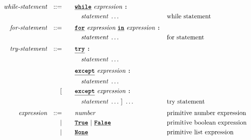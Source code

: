 \begin{alignat*}{9}
&& \textit{while-statement} && ::= &\quad &&  \textbf{\texttt{\underline{while}}}\ \textit{expression} \ 
                                           \textbf{\texttt{:}}  \\
&&                       &&     &\quad && \quad \textit{statement} \ \ldots \quad
                                                           &&  \textrm{while statement} \\[1mm]
&& \textit{for-statement} && ::= &\quad &&  \textbf{\texttt{\underline{for}}}\ \textit{expression} \ 
                                           \textbf{\texttt{\underline{in}}}\ \textit{expression} \ \textbf{\texttt{:}}  \\
&&                       &&     &\quad && \quad \textit{statement} \ \ldots \quad
                                                           &&  \textrm{for statement} \\[1mm]
&& \textit{try-statement} && ::= &\quad &&  \textbf{\texttt{\underline{try}}}\                      
\textbf{\texttt{:}}  \\
&&                       &&     &\quad && \quad \textit{statement} \ \ldots \quad
                                                           &&  \\[1mm]
&&                       &&     &\quad &&  \textbf{\texttt{\underline{except}}}\ \textit{expression} \ 
                                            \textbf{\texttt{:}}  \\
&&                       &&     &\quad && \quad \textit{statement} \ \ldots \quad
                                                           &&  \\
&&                       &&     [&\quad &&  \textbf{\texttt{\underline{except}}}\ \textit{expression} \ 
                                            \textbf{\texttt{:}}  \\
&&                       &&     &\quad && \quad \textit{statement} \ \ldots \ ] \ \ldots \quad
                                                           &&  \textrm{try statement} \\[1mm]                                    
&& \textit{expression}   && ::= &\quad &&  \textit{number}   && \textrm{primitive number expression}\\
&&                       && |   &\quad && \textbf{\texttt{\underline{True}}}\ |\ \textbf{\texttt{\underline{False}}}
                                                           && \textrm{primitive boolean expression}\\
&&                       && |   &\quad &&  \textbf{\texttt{\underline{None}}} \   && \textrm{primitive list expression}\\

\end{alignat*}
